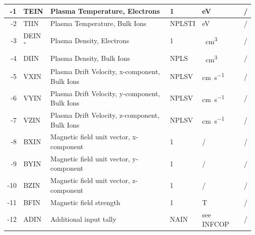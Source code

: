 \begin{landscape}
\begin{longtable}{|r|l|l|l|l|c|}
    -1                     & TEIN                         & Plasma Temperature,
    Electrons              & 1                            & \si{\electronvolt}                & /  \\
    \hline
    -2                     & TIIN                         & Plasma Temperature, Bulk
    Ions                   & NPLSTI                       & \si{\electronvolt}                & /  \\ \hline
    -3                     & DEIN$^*$                     & Plasma Density, Electrons
			   & 1                            & \si{\per\cubic\centi\metre}       & /  \\ \hline
    -4                     & DIIN                         & Plasma Density, Bulk Ions
			   & NPLS                         & \si{\per\cubic\centi\metre}       & /  \\ \hline
    -5                     & VXIN                         & Plasma Drift Velocity,
    x-component, Bulk Ions & NPLSV
			   & \si{\centi\metre\per\second} & /
    \\ \hline
    -6                     & VYIN                         & Plasma Drift Velocity,
    y-component, Bulk Ions & NPLSV
			   & \si{\centi\metre\per\second} & /
    \\ \hline
    -7                     & VZIN                         & Plasma Drift Velocity,
    z-component, Bulk Ions & NPLSV
			   & \si{\centi\metre\per\second} & /
    \\ \hline
    -8                     & BXIN                         & Magnetic field unit vector,
    x-component            & 1                            & /                                 & /
    \\ \hline
    -9                     & BYIN                         & Magnetic field unit vector,
    y-component            & 1                            & /                                 & /
    \\ \hline
    -10                    & BZIN                         & Magnetic field unit vector,
    z-component            & 1                            & /                                 & /
    \\ \hline
    -11                    & BFIN                         & Magnetic field strength
			   & 1                            & \si{\tesla}                       & /
    \\ \hline
    -12                    & ADIN                         & Additional input tally
			   & NAIN                         & see INFCOP                        & /

\end{longtable}
\end{landscape}
